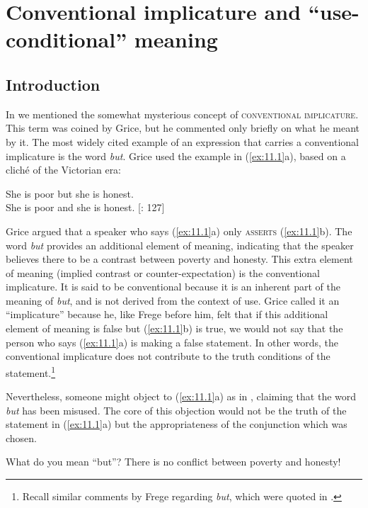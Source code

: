 \chapter{Conventional implicature and “use-conditional” meaning}\label{sec:11}

\section{Introduction}\label{sec:11.1}

In  we mentioned the somewhat mysterious concept of \textsc{conventional implicature}. This term was coined by Grice, but he commented only briefly on what he meant by it. The most widely cited example of an expression that carries a conventional implicature is the word \textit{but}. Grice used the example in (\ref{ex:11.1}a), based on a cliché of the Victorian era:


\ea \label{ex:11.1}
\ea She is poor but she is honest.\\
\ex She is poor and she is honest.  [\citealt{Grice1961}: 127]
                       \z
\z


Grice argued that a speaker who says (\ref{ex:11.1}a) only \textsc{asserts} (\ref{ex:11.1}b). The word \textit{but} provides an additional element of meaning, indicating that the speaker believes there to be a contrast between poverty and honesty. This extra element of meaning (implied contrast or counter-expectation) is the conventional implicature. It is said to be conventional because it is an inherent part of the meaning of \textit{but}, and is not derived from the context of use. Grice called it an “implicature” because he, like Frege before him, felt that if this additional element of meaning is false but (\ref{ex:11.1}b) is true, we would not say that the person who says (\ref{ex:11.1}a) is making a false statement. In other words, the conventional implicature does not contribute to the truth conditions of the statement.\footnote{Recall similar comments by Frege regarding \textit{but}, which were quoted in .}



Nevertheless, someone might object to (\ref{ex:11.1}a) as in , claiming that the word \textit{but} has been misused. The core of this objection would not be the truth of the statement in (\ref{ex:11.1}a) but the appropriateness of the conjunction which was chosen.


\ea \label{ex:11.2}
What do you mean “but”? There is no conflict between poverty and honesty!
\z


